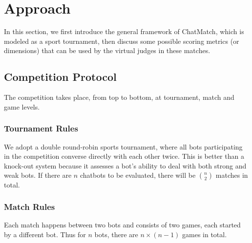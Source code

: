 \section{Approach}
\label{sec:approach}
In this section, we first introduce the general framework of ChatMatch, which is modeled as
a sport tournament, then discuss some possible scoring metrics (or dimensions) 
that can be used by the virtual judges in these matches. 


\subsection{Competition Protocol}
\label{sec:competition}
The competition takes place, from top to bottom, at tournament, match and
game levels.

\subsubsection{Tournament Rules}
We adopt a double round-robin 
sports tournament, where all bots participating in the competition 
converse directly with each other twice.
This is better than a knock-out system because it assesses a bot's ability to
deal with both strong and weak bots.
If there are $n$ chatbots to be evaluated, 
there will be $n \choose 2$ matches in total.

\subsubsection{Match Rules}
Each match happens between two bots and consists of two games,
each started by a different bot. Thus for $n$ bots, there are
$n \times (n-1)$ games in total. 

